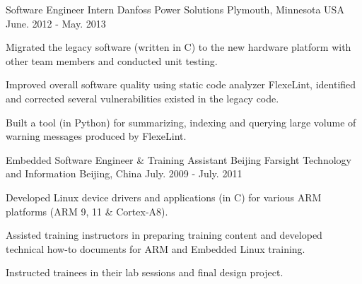 

\begin{cventries}

  \cventry
    {Software Engineer Intern} %
    {Danfoss Power Solutions} %
    {Plymouth, Minnesota USA} %
    {June. 2012 - May. 2013} %
    {
      \begin{cvitems} %
        \item {Migrated the legacy software (written in C) to the new hardware
    platform with other team members and conducted unit testing.}
       \item {Improved overall software quality using static code analyzer FlexeLint, identified
    and corrected several vulnerabilities existed in the legacy code.}
           \item {Built a tool (in Python) for summarizing, indexing and
    querying large volume of warning messages produced by FlexeLint.}
      \end{cvitems}
    }

  \cventry
    {Embedded Software Engineer \& Training Assistant} %
    {Beijing Farsight Technology and Information} %
    {Beijing, China} %
    {July. 2009 - July. 2011} %
    {
      \begin{cvitems} %
        \item {Developed Linux device drivers and applications (in C) for various ARM
    platforms (ARM 9, 11 \& Cortex-A8).}
        \item {Assisted training instructors in preparing training
    content and developed technical how-to documents for ARM and
    Embedded Linux training.}
        \item {Instructed trainees in their lab sessions and final design project.}
      \end{cvitems}
    }


\end{cventries}

